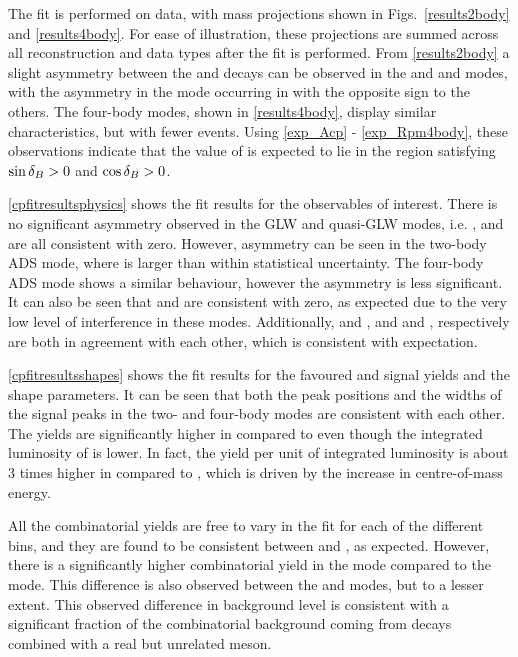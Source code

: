 The \CP fit is performed on data, with mass projections shown in Figs.~\ref{results2body} and \ref{results4body}. For ease of illustration, these projections are summed across all \KS reconstruction and data types after the fit is performed. From \fig\ref{results2body} a slight asymmetry between the \Bp and \Bm decays can be observed in the \kk and \pipi and \pik modes, with the asymmetry in the \pik mode occurring in with the opposite sign to the others. The four-body modes, shown in \fig\ref{results4body}, display similar characteristics, but with fewer events. Using \eqns\ref{exp_Acp} - \ref{exp_Rpm4body}, these observations indicate that the value of \deltab is expected to lie in the region satisfying $\sin\delta_B > 0$ and $\cos\delta_B >0$. 

\Tab\ref{cpfitresultsphysics} shows the \CP fit results for the \CP observables of interest. There is no significant asymmetry observed in the GLW and quasi-GLW modes, i.e. \Akk, \Apipi and \Apipipipi are all consistent with zero. However, asymmetry can be seen in the two-body ADS mode, where \Rptwo is larger than \Rmtwo within statistical uncertainty. The four-body ADS mode shows a similar behaviour, however the asymmetry is less significant. It can also be seen that \Akpi and \Akpipipi are consistent with zero, as expected due to the very low level of interference in these modes. Additionally, \Akk and \Apipi, and \Rkk and \Rpipi, respectively are both in agreement with each other, which is consistent with expectation.

\Tab\ref{cpfitresultsshapes} shows the fit results for the favoured \kpi and \kpipipi signal yields and the shape parameters. It can be seen that both the peak positions and the widths of the signal peaks in the two- and four-body modes are consistent with each other. The yields are significantly higher in \runtwo compared to \runone even though the integrated luminosity of \runtwo is lower. In fact, the yield per unit of integrated luminosity is about 3 times higher in \runone compared to \runtwo, which is driven by the increase in \runtwo centre-of-mass energy. 

All the combinatorial yields are free to vary in the \CP fit for each of the different bins, and they are found to be consistent between \Bm and \Bp, as expected. However, there is a significantly higher combinatorial yield in the \kpi mode compared to the \pik mode. This difference is also observed between the \kpipipi and \pikpipi modes, but to a lesser extent. This observed difference in background level is consistent with a significant fraction of the combinatorial background coming from  decays combined with a real but unrelated \KS meson. 

